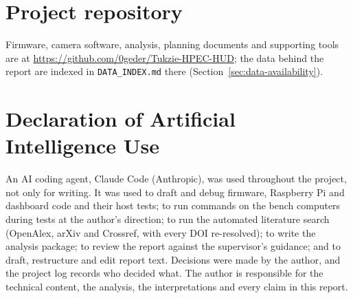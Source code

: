 \section{Project repository}

Firmware, camera software, analysis, planning documents and supporting tools are at \url{https://github.com/0geder/Tukzie-HPEC-HUD}; the data behind the report are indexed in \texttt{DATA\_INDEX.md} there (Section~\ref{sec:data-availability}).

\section{Declaration of Artificial Intelligence Use}
\label{app:ai}

An AI coding agent, Claude Code (Anthropic), was used throughout the project, not only for writing. It was used to draft and debug firmware, Raspberry Pi and dashboard code and their host tests; to run commands on the bench computers during tests at the author's direction; to run the automated literature search (OpenAlex, arXiv and Crossref, with every DOI re-resolved); to write the analysis package; to review the report against the supervisor's guidance; and to draft, restructure and edit report text. Decisions were made by the author, and the project log records who decided what. The author is responsible for the technical content, the analysis, the interpretations and every claim in this report.

